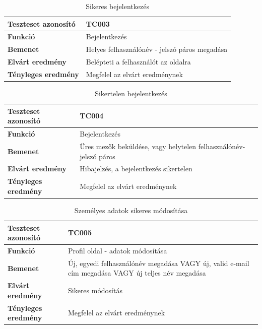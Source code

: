 \begin{table}[h!]
	\centering
	\begin{tabular}{|l|p{10cm}|}
		\hline
		\textbf{Teszteset azonosító} & TC003 \\ \hline
		\textbf{Funkció} & Bejelentkezés \\ \hline
		\textbf{Bemenet} & Helyes felhasználónév - jelszó páros megadása \\ \hline
		\textbf{Elvárt eredmény} & Belépteti a felhasználót az oldalra \\ \hline
		\textbf{Tényleges eredmény} & Megfelel az elvárt eredménynek \\ \hline
	\end{tabular}
	\caption{Sikeres bejelentkezés}
	\label{tab:bejelentkezes_hibas_adatokkal}
\end{table}

\begin{table}[h!]
	\centering
	\begin{tabular}{|l|p{10cm}|}
		\hline
		\textbf{Teszteset azonosító} & TC004 \\ \hline
		\textbf{Funkció} & Bejelentkezés \\ \hline
		\textbf{Bemenet} & Üres mezők beküldése, vagy helytelen felhasználónév-jelszó páros \\ \hline
		\textbf{Elvárt eredmény} & Hibajelzés, a bejelentkezés sikertelen\\ \hline
		\textbf{Tényleges eredmény} & Megfelel az elvárt eredménynek \\ \hline
	\end{tabular}
	\caption{Sikertelen bejelentkezés}
	\label{tab:bejelentkezes_ures}
\end{table}

\begin{table}[h!]
	\centering
	\begin{tabular}{|l|p{10cm}|}
		\hline
		\textbf{Teszteset azonosító} & TC005 \\ \hline
		\textbf{Funkció} & Profil oldal - adatok módosítása \\ \hline
		\textbf{Bemenet} & Új, egyedi felhasználónév megadása VAGY új, valid e-mail cím megadása VAGY új teljes név megadása \\ \hline
		\textbf{Elvárt eredmény} & Sikeres módosítás \\ \hline
		\textbf{Tényleges eredmény} & Megfelel az elvárt eredménynek \\ \hline
	\end{tabular}
	\caption{Személyes adatok sikeres módosítása}
	\label{tab:profil_felhasznalonev_modositas}
\end{table}

